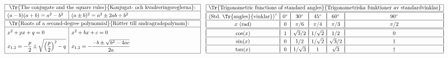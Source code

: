 \documentclass[a4paper]{article}%
\begin{document}
\subsubsection*{} %

{%
\let\F\frac
\newcommand\CC[1]{#1^\circ}
\def\vPad{&&&&&\\*[-10pt]}
\def\myEnd{\\\hline\vPad}
\newcommand\tW{{\sqrt2}}
\newcommand\tH{{\sqrt3}}
$
\begin{array}[m]{|l|l|}
\hline
\multicolumn{2}{|l|}{
  \mbox{ \Tr{The conjugate and the square rules}{Konjugat- och kvadreringsreglerna}: }
} \\
\hline

\rule[-4pt]{0pt}{15pt}
   (a-b)(a+b) = a^2-b^2 & (a\pm b)^2 = a^2\pm2ab+b^2 \\
\hline
\hline
\multicolumn{2}{|l|}{
  \mbox{ \Tr{Roots of a second-degree polynomial}{Rötter till andragradspolynom}: }
} \\
\hline
\rule[-2pt]{0pt}{15pt}
x^2+px+q = 0 & x^2+bx+c = 0 \\
  \displaystyle
\rule[-10pt]{0pt}{32pt}
  x_{1,2} = -\frac p2\pm\sqrt{\Bigl(\frac p2\Bigr)^2-q}
&
  \displaystyle
   x_{1,2} = -\frac{-b\pm\sqrt{b^2-4ac}}{2a}
\\
\hline
\end{array}
\quad
\begin{array}{|c|c|c|c|c|c|}
\hline
\multicolumn{6}{|l|}{
  \mbox{\Tr{Trigonometric functions of standard angles}{Trigonometriska funktioner av standardvinklar}}
} \\
\hline
\hline\vPad
\mbox{(Std.~\Tr{angles}{vinklar})}^\circ
  & \CC{0} &\CC{30} &\CC{45} &\CC{60} &\CC{90}   %
 \myEnd
 x \mbox{ (rad)}
        & 0     & \pi/6 & \pi/4 &  \pi/3 & \pi/2 %
 \\\hline\hline\vPad
 \cos(x)&   1   & \tH/2 & 1/\tW &  1/2  &   0    %
 \myEnd
 \sin(x)&   0   &   1/2 & 1/\tW & \tH/2 &   1    %
 \myEnd
 \tan(x)&   0   & 1/\tH &   1   & \tH   &
                                    \dag %
 \\\hline
\end{array}
$
}%
\end{document}
